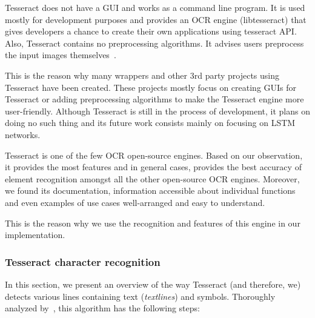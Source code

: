 Tesseract does not have a GUI and works as a command line program. It is used mostly for development purposes and provides an OCR engine (libtesseract) that gives developers a chance to create their own applications using tesseract API. Also, Tesseract contains no preprocessing algorithms. It advises users preprocess the input images themselves~\citep{TesseractQual}.

This is the reason why many wrappers and other 3rd party projects using Tesseract have been created. These projects mostly focus on creating GUIs for Tesseract or adding preprocessing algorithms to make the Tesseract engine more user-friendly. Although Tesseract is still in the process of development, it plans on doing no such thing and its future work consists mainly on focusing on LSTM networks.

Tesseract is one of the few OCR open-source engines. Based on our observation, it provides the most features and in general cases, provides the best accuracy of element recognition amongst all the other open-source OCR engines. Moreover, we found its documentation, information accessible about individual functions and even examples of use cases well-arranged and easy to understand.

This is the reason why we use the recognition and features of this engine in our implementation.

\subsubsection{Tesseract character recognition} \label{tesseractCharacterRecognition}

In this section, we present an overview of the way Tesseract (and therefore, we) detects various lines containing text (\emph{textlines}) and symbols. Thoroughly analyzed by~\citet{smith2007overview}, this algorithm has the following steps:

